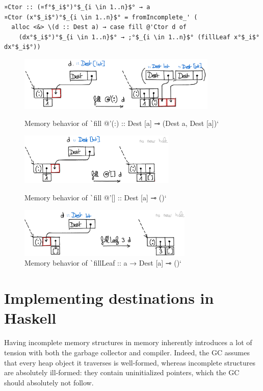 \documentclass[english]{jflart}
\newlength{\currentparskip}
\newenvironment{unbreakable}
{%
  \setlength{\currentparskip}{\parskip}%
  \setlength{\parskip}{\currentparskip}%
  \par\vspace{0.5\baselineskip}%
  \noindent\begin{minipage}{\textwidth}%
    \setlength{\parskip}{\currentparskip}%
}
{%
  \end{minipage}%
  \par\vspace{0.5\baselineskip}%
}
\begin{document}
\begin{unbreakable}
{\small
\begin{verbatim}
¤Ctor :: (¤f°$_i$°)°$_{i \in 1..n}$° → a
¤Ctor (x°$_i$°)°$_{i \in 1..n}$° = fromIncomplete_' (
  alloc <&> \(d :: Dest a) → case fill @'Ctor d of
    (dx°$_i$°)°$_{i \in 1..n}$° → ;°$_{i \in 1..n}$° (fillLeaf x°$_i$° dx°$_i$°))
\end{verbatim}
}
\end{unbreakable}

\begin{figure}[t]\centering
  \includegraphics[width=9.5cm]{fillCons.png}
  \caption{Memory behavior of \texttt`fill @'(:) :: Dest [a] ⊸ (Dest a, Dest [a])`}
  \label{fig:schema-fillCons}

  \includegraphics[width=7.5cm]{fillNil.png}
  \caption{Memory behavior of \texttt`fill @'[] :: Dest [a] ⊸ ()`}
  \label{fig:schema-fillNil}

  \includegraphics[width=8.3cm]{fillLeaf.png}
  \caption{Memory behavior of \texttt`fillLeaf :: a → Dest [a] ⊸ ()`}
  \label{fig:schema-fillLeaf}
\end{figure}

\section{Implementing destinations in Haskell}\label{sec:implementation}

Having incomplete memory structures in memory inherently introduces a lot of tension with both the garbage collector and compiler. Indeed, the GC assumes that every heap object it traverses is well-formed, whereas incomplete structures are absolutely ill-formed: they contain uninitialized pointers, which the GC should absolutely not follow.
\end{document}
